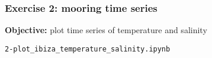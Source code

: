 \begin{frame}[c, fragile]
\frametitle{Exercise 2: mooring time series}

\textbf{Objective:} plot time series of temperature and salinity

\vspace{1cm}

\exercise \verb|2-plot_ibiza_temperature_salinity.ipynb|

\end{frame}